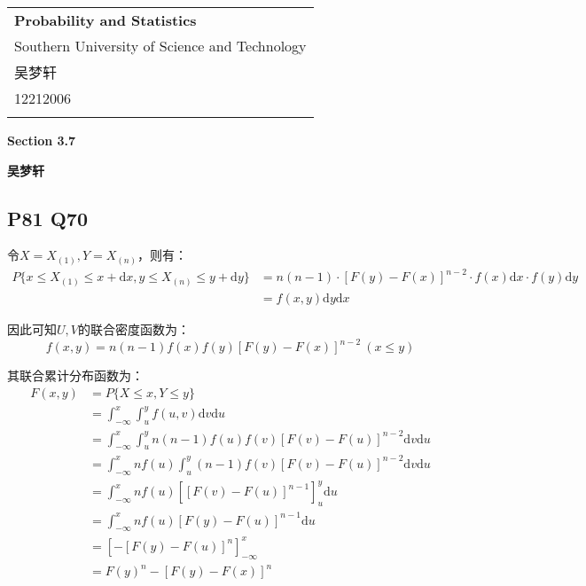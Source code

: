 \documentclass[a4paper,12pt]{ctexart}
\begin{document}
\thispagestyle{empty} %

\begin{tabular}{p{15.5cm}}
{\large \bf Probability and Statistics} \\
Southern University of Science and Technology \\ 吴梦轩 \\ 12212006 \\
\hline
\\
\end{tabular}

\vspace*{0.3cm} %

\begin{center}
	{\Large \bf Section 3.7}
	\vspace{2mm}

	{\bf 吴梦轩}
		
\end{center}  

\vspace{0.4cm}

\subsection*{P81 Q70}

令$X = X_{(1)}, Y = X_{(n)}$，则有：
\begin{align*}
	P\{x \leq X_{(1)} \leq x + \mathrm{d} x, y \leq X_{(n)} \leq y + \mathrm{d} y\} &= n(n-1) \cdot [F(y) - F(x)]^{n-2} \cdot f(x) \mathrm{d} x \cdot f(y) \mathrm{d} y \\
	&= f(x,y) \mathrm{d} y \mathrm{d} x
\end{align*}

因此可知$U,V$的联合密度函数为：
\begin{equation*}
	f(x,y) = n(n-1)f(x)f(y)[F(y) - F(x)]^{n-2}\ (x \leq y)
\end{equation*}

其联合累计分布函数为：
\begin{align*}
	F(x,y) &= P\{X \leq x, Y \leq y\} \\
	&= \int_{-\infty}^{x} \int_{u}^{y} f(u,v) \mathrm{d} v \mathrm{d} u \\
	&= \int_{-\infty}^{x} \int_{u}^{y} n(n-1)f(u)f(v)[F(v) - F(u)]^{n-2} \mathrm{d} v \mathrm{d} u \\
	&= \int_{-\infty}^{x} nf(u) \int_{u}^{y} (n-1)f(v)[F(v) - F(u)]^{n-2} \mathrm{d} v \mathrm{d} u \\
	&= \int_{-\infty}^{x} nf(u) \left[[F(v) - F(u)]^{n-1} \right]_{u}^{y} \mathrm{d} u \\
	&= \int_{-\infty}^{x} nf(u) [F(y) - F(u)]^{n-1} \mathrm{d} u \\
	&= \left[ - [F(y) - F(u)]^{n} \right]_{-\infty}^{x} \\
	&= F(y)^n - [F(y) - F(x)]^{n}
\end{align*}
\end{document}

